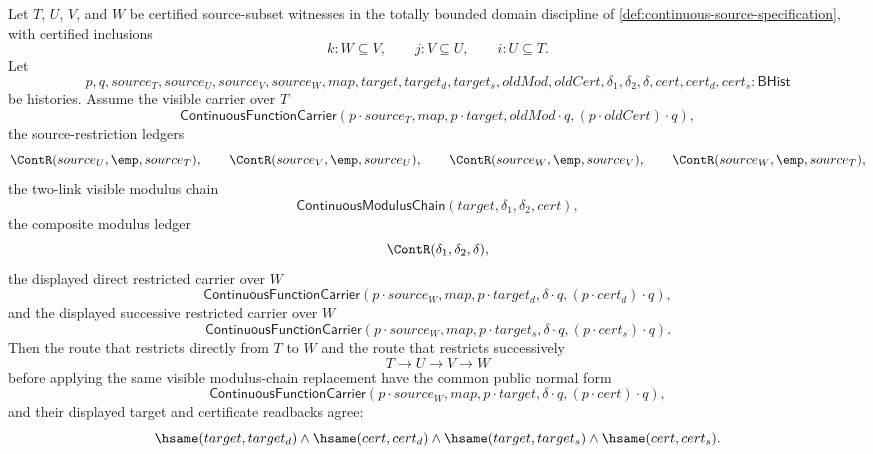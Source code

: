 \begin{theorem}
\label{thm:continuous-restriction-visible-modulus-chain-functorial-normal-form}
Let $T$, $U$, $V$, and $W$ be certified source-subset witnesses in the totally bounded domain discipline of \autoref{def:continuous-source-specification}, with certified inclusions
$$
k:W\subseteq V,\qquad j:V\subseteq U,\qquad i:U\subseteq T.
$$
Let
$$
p,q,source_T,source_U,source_V,source_W,map,target,target_d,target_s,
oldMod,oldCert,\delta_1,\delta_2,\delta,cert,cert_d,cert_s:\mathsf{BHist}
$$
be histories. Assume the visible carrier over $T$
$$
\mathsf{ContinuousFunctionCarrier}(p\cdot source_T,map,p\cdot target,
oldMod\cdot q,(p\cdot oldCert)\cdot q),
$$
the source-restriction ledgers
$$
\ContR(source_U,\emp,source_T),\qquad
\ContR(source_V,\emp,source_U),\qquad
\ContR(source_W,\emp,source_V),\qquad
\ContR(source_W,\emp,source_T),
$$
the two-link visible modulus chain
$$
\mathsf{ContinuousModulusChain}(target,\delta_1,\delta_2,cert),
$$
the composite modulus ledger
$$
\ContR(\delta_1,\delta_2,\delta),
$$
the displayed direct restricted carrier over $W$
$$
\mathsf{ContinuousFunctionCarrier}(p\cdot source_W,map,p\cdot target_d,
\delta\cdot q,(p\cdot cert_d)\cdot q),
$$
and the displayed successive restricted carrier over $W$
$$
\mathsf{ContinuousFunctionCarrier}(p\cdot source_W,map,p\cdot target_s,
\delta\cdot q,(p\cdot cert_s)\cdot q).
$$
Then the route that restricts directly from $T$ to $W$ and the route that restricts successively
$$
T\longrightarrow U\longrightarrow V\longrightarrow W
$$
before applying the same visible modulus-chain replacement have the common public normal form
$$
\mathsf{ContinuousFunctionCarrier}(p\cdot source_W,map,p\cdot target,
\delta\cdot q,(p\cdot cert)\cdot q),
$$
and their displayed target and certificate readbacks agree:
$$
\hsame(target,target_d)\land\hsame(cert,cert_d)\land
\hsame(target,target_s)\land\hsame(cert,cert_s).
$$
\end{theorem}
